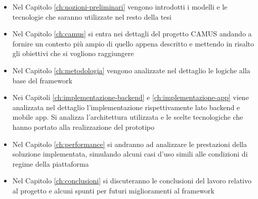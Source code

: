 \begin{itemize}
	\item 
	Nel Capitolo \ref{ch:nozioni-preliminari} vengono introdotti i modelli e le tecnologie che saranno utilizzate nel resto della tesi
	\item 
	Nel Capitolo \ref{ch:camus} si entra nei dettagli del progetto CAMUS andando a fornire un contesto più ampio di quello appena descritto e mettendo in risalto gli obiettivi che si vogliono raggiungere
	\item 
	Nel Capitolo \ref{ch:metodologia} vengono analizzate nel dettaglio le logiche alla base del framework
	\item 
	Nei Capitoli \ref{ch:implementazione-backend} e \ref{ch:implementazione-app} viene analizzata nel dettaglio l'implementazione rispettivamente lato backend e mobile app. Si analizza l'architettura utilizzata e le scelte tecnologiche che hanno portato alla realizzazione del prototipo
	\item 
	Nel Capitolo \ref{ch:performance} si andranno ad analizzare le prestazioni della soluzione implementata, simulando alcuni casi d'uso simili alle condizioni di regime della piattaforma
	\item 
	Nel Capitolo \ref{ch:conclusioni} si discuteranno le conclusioni del lavoro relativo al progetto e alcuni spunti per futuri miglioramenti al framework
\end{itemize}